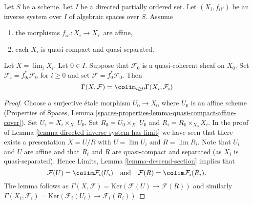 \begin{lemma}
\label{lemma-descend-section}
Let $S$ be a scheme. Let $I$ be a directed partially ordered set.
Let $(X_i, f_{ii'})$ be an inverse system over $I$ of algebraic spaces
over $S$. Assume
\begin{enumerate}
\item the morphisms $f_{ii'} : X_i \to X_{i'}$ are affine,
\item each $X_i$ is quasi-compact and quasi-separated.
\end{enumerate}
Let $X = \lim_i X_i$. Let $0 \in I$. Suppose that $\mathcal{F}_0$ is a
quasi-coherent sheaf on $X_0$. Set $\mathcal{F}_i = f_{0i}^*\mathcal{F}_0$
for $i \geq 0$ and set $\mathcal{F} = f_0^*\mathcal{F}_0$. Then
$$
\Gamma(X, \mathcal{F}) = \colim_{i \geq 0} \Gamma(X_i, \mathcal{F}_i)
$$
\end{lemma}

\begin{proof}
Choose a surjective \'etale morphism $U_0 \to X_0$ where $U_0$ is an affine
scheme (Properties of Spaces, Lemma
\ref{spaces-properties-lemma-quasi-compact-affine-cover}).
Set $U_i = X_i \times_{X_0} U_0$.
Set $R_0 = U_0 \times_{X_0} U_0$ and $R_i = R_0 \times_{X_0} X_i$.
In the proof of Lemma \ref{lemma-directed-inverse-system-has-limit} we have
seen that there exists a presentation $X = U/R$ with
$U = \lim U_i$ and $R = \lim R_i$.
Note that $U_i$ and $U$ are affine and that $R_i$ and $R$ are
quasi-compact and separated (as $X_i$ is quasi-separated). Hence
Limits, Lemma \ref{lemma-descend-section}
implies that
$$
\mathcal{F}(U) = \colim \mathcal{F}_i(U_i)
\quad\text{and}\quad
\mathcal{F}(R) = \colim \mathcal{F}_i(R_i).
$$
The lemma follows as
$\Gamma(X, \mathcal{F}) = \text{Ker}(\mathcal{F}(U) \to \mathcal{F}(R))$
and similarly
$\Gamma(X_i, \mathcal{F}_i) =
\text{Ker}(\mathcal{F}_i(U_i) \to \mathcal{F}_i(R_i))$
\end{proof}












